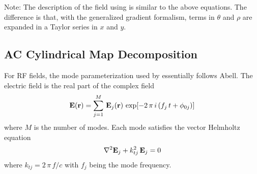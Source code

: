 Note: The description of the field using \cite{b:newton} is similar to
the above equations. The difference is that, with the generalized gradient formalism, terms in
$\theta$ and $\rho$ are expanded in a Taylor series in $x$ and $y$.

\subsection{AC Cylindrical Map Decomposition}
\label{s:cylind.ac}

For RF fields, the  mode parameterization used by \bmad essentially
follows Abell\cite{b:rf.abell}. The electric field is the real part of the complex field
\begin{equation}
  {\bf E}({\bf r}) = \sum_{j=1}^M \, {\bf E}_j({\bf r}) \, \exp[{-2\, \pi \, i \, (f_j \, t + \phi_{0j})}]
  \label{eseei}
\end{equation}
where $M$ is the number of modes. Each mode satisfies the vector Helmholtz
equation
\begin{equation}
  \nabla^2 {\bf E}_j + k_{tj}^2 \, {\bf E}_j = 0
  \label{bke}
\end{equation}
where $k_{tj} = 2 \, \pi \, f/c$ with $f_j$ being the mode frequency.


